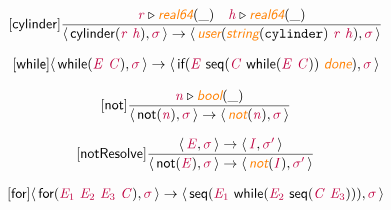 \documentclass[10pt,leqno,fleqn]{article}
\newcommand{\artVariable}[1]{\mbox{\color{purple}\em #1\/}}
\newcommand{\artConstructor}[1]{\mbox{\sf #1}}
\newcommand{\artCaseInsensitiveLiteral}[1]{\mbox{\tt #1}}
\newcommand{\artSpecial}[1]{\mbox{\color{orange}\sf\em #1}}
\begin{document}
\begin{equation}
\tag*{[\artConstructor{\sf cylinder}]}
\begin{split}\frac{ \artVariable{r}\triangleright \artSpecial{real64}(\_) \quad  \artVariable{h}\triangleright \artSpecial{real64}(\_) }{\langle\, \artConstructor{\sf cylinder}(\artVariable{r}\ \artVariable{h}), \artVariable{$\sigma$}\,\rangle \rightarrow \langle\, \artSpecial{user}(\artSpecial{string}(\artCaseInsensitiveLiteral{cylinder})\ \artVariable{r}\ \artVariable{h}), \artVariable{$\sigma$}\,\rangle }
\end{split}
\end{equation}

\begin{equation}
\tag*{[\artConstructor{\sf while}]}
\begin{split}\langle\, \artConstructor{\sf while}(\artVariable{E}\ \artVariable{C}), \artVariable{$\sigma$}\,\rangle \rightarrow \langle\, \artConstructor{\sf if}(\artVariable{E}\ \artConstructor{\sf seq}(\artVariable{C}\ \artConstructor{\sf while}(\artVariable{E}\ \artVariable{C}))\ \artSpecial{done}), \artVariable{$\sigma$}\,\rangle 
\end{split}
\end{equation}

\begin{equation}
\tag*{[\artConstructor{\sf not}]}
\begin{split}\frac{ \artVariable{n}\triangleright \artSpecial{bool}(\_) }{\langle\, \artConstructor{\sf not}(\artVariable{n}), \artVariable{$\sigma$}\,\rangle \rightarrow \langle\, \artSpecial{not}(\artVariable{n}), \artVariable{$\sigma$}\,\rangle }
\end{split}
\end{equation}

\begin{equation}
\tag*{[\artConstructor{\sf notResolve}]}
\begin{split}\frac{\langle\, \artVariable{E}, \artVariable{$\sigma$}\,\rangle \rightarrow \langle\, \artVariable{I}, \artVariable{$\sigma$\/$^\prime$}\,\rangle }{\langle\, \artConstructor{\sf not}(\artVariable{E}), \artVariable{$\sigma$}\,\rangle \rightarrow \langle\, \artSpecial{not}(\artVariable{I}), \artVariable{$\sigma$\/$^\prime$}\,\rangle }
\end{split}
\end{equation}

\begin{equation}
\tag*{[\artConstructor{\sf for}]}
\begin{split}\langle\, \artConstructor{\sf for}(\artVariable{E$_{1}$}\ \artVariable{E$_{2}$}\ \artVariable{E$_{3}$}\ \artVariable{C}), \artVariable{$\sigma$}\,\rangle \rightarrow \langle\, \artConstructor{\sf seq}(\artVariable{E$_{1}$}\ \artConstructor{\sf while}(\artVariable{E$_{2}$}\ \artConstructor{\sf seq}(\artVariable{C}\ \artVariable{E$_{3}$}))), \artVariable{$\sigma$}\,\rangle 
\end{split}
\end{equation}
\end{document}
